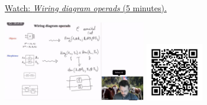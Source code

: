 
\begin{minipage}{10cm}
    \href{https://act4e-spring21.netlify.app/videos/spring2021-operads-b:wiring-diags-operads.html}{Watch: \emph{Wiring diagram operads} (5 minutes).}
        
    \href{https://act4e-spring21.netlify.app/videos/spring2021-operads-b:wiring-diags-operads.html}{\includegraphics[height=3.5cm]{spring2021-operads-b:wiring-diags-operads/thumbnails.jpg}}
    \href{https://act4e-spring21.netlify.app/videos/spring2021-operads-b:wiring-diags-operads.html}{\includegraphics[height=2.5cm]{spring2021-operads-b:wiring-diags-operads/qrcode.png}}
\end{minipage}
